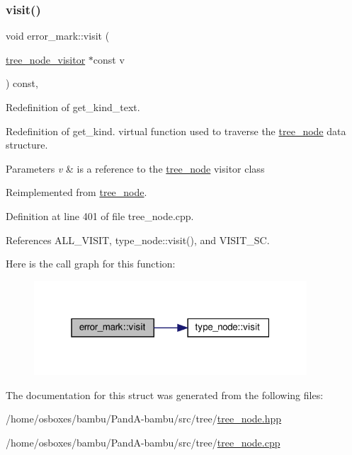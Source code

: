 \subsubsection{\texorpdfstring{visit()}{visit()}}
{\footnotesize\ttfamily void error\+\_\+mark\+::visit (\begin{DoxyParamCaption}\item[{\hyperlink{classtree__node__visitor}{tree\+\_\+node\+\_\+visitor} $\ast$const}]{v }\end{DoxyParamCaption}) const\hspace{0.3cm}{\ttfamily [override]}, {\ttfamily [virtual]}}



Redefinition of get\+\_\+kind\+\_\+text. 

Redefinition of get\+\_\+kind. virtual function used to traverse the \hyperlink{classtree__node}{tree\+\_\+node} data structure. 
\begin{DoxyParams}{Parameters}
{\em v} & is a reference to the \hyperlink{classtree__node}{tree\+\_\+node} visitor class \\
\hline
\end{DoxyParams}


Reimplemented from \hyperlink{classtree__node_aa9abba3f1b30e0be80b4a56b188c6ecc}{tree\+\_\+node}.



Definition at line 401 of file tree\+\_\+node.\+cpp.



References A\+L\+L\+\_\+\+V\+I\+S\+IT, type\+\_\+node\+::visit(), and V\+I\+S\+I\+T\+\_\+\+SC.

Here is the call graph for this function\+:
\nopagebreak
\begin{figure}[H]
\begin{center}
\leavevmode
\includegraphics[width=289pt]{d3/d69/structerror__mark_a13abf9f9413d995a63882a657049d7c5_cgraph}
\end{center}
\end{figure}


The documentation for this struct was generated from the following files\+:\begin{DoxyCompactItemize}
\item 
/home/osboxes/bambu/\+Pand\+A-\/bambu/src/tree/\hyperlink{tree__node_8hpp}{tree\+\_\+node.\+hpp}\item 
/home/osboxes/bambu/\+Pand\+A-\/bambu/src/tree/\hyperlink{tree__node_8cpp}{tree\+\_\+node.\+cpp}\end{DoxyCompactItemize}
